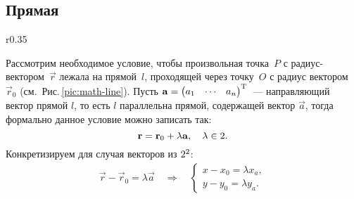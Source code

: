 \subsection{Прямая}

\begin{wrapfigure}{r}{0.35\tw}
    \centering
    \vspace{-.8pc}
    \caption{}
    \label{pic:math-line}
\end{wrapfigure}
Рассмотрим необходимое условие, чтобы произвольная точка~$P$ с радиус-вектором~$\vec{r}$ лежала на прямой~$l$, проходящей через точку~$O$ с радиус вектором $\vec{r}_0$ (см.~Рис.\,\ref{pic:math-line}). Пусть $ \mathbf{a} = \begin{pmatrix} a_1 & \cdots & a_n\end{pmatrix}^{\operatorname{T}}$~--- направляющий вектор прямой $l$, то есть $l$ параллельна прямой, содержащей вектор $\vec{a}$, тогда формально данное условие можно записать так:
\begin{equation}
    \mathbf{r} = \mathbf{r}_0 + \lambda \mathbf{a},\quad \lambda \in 2.
\end{equation}
Конкретизируем для случая векторов из $2^2$:
\begin{gather*}
    \vec{r} - \vec{r}_0 = \lambda \vec{a} \quad \Rightarrow \quad
    \begin{cases}
        x - x_0 = \lambda x_a,\\
        y - y_0 = \lambda y_a.
    \end{cases}
\end{gather*}
